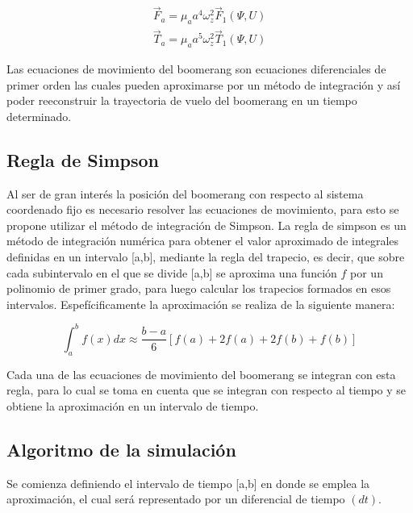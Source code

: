 		\begin{subequations}
    	\begin{align}
		{\vec{F}}_{a}={\mu}_{a}{a}^{4}{\omega}_{z}^{2}{\vec{F}}_{1}(\Psi,U)\\
		{\vec{T}}_{a}={\mu}_{a}{a}^{5}{\omega}_{z}^{2}{\vec{T}}_{1}(\Psi,U)
		\end{align}
		\label{ec64}
		\end{subequations}

	Las ecuaciones de movimiento del boomerang son ecuaciones diferenciales de primer orden las cuales pueden aproximarse por un método de integración y así poder reeconstruir la trayectoria de vuelo del boomerang en un tiempo determinado.

	\subsection{Regla de Simpson}

	Al ser de gran interés la posición del boomerang con respecto al sistema coordenado fijo es necesario resolver las ecuaciones de movimiento, para esto se propone utilizar el método de integración de Simpson.
	La regla de simpson es un método de integración numérica para obtener el valor aproximado de integrales definidas en un intervalo [a,b], mediante la regla del trapecio, es decir, que sobre cada subintervalo en el que se divide [a,b] se aproxima una función $f$ por un polinomio de primer grado, para luego calcular los trapecios formados en esos intervalos. Espefícificamente la aproximación se realiza de la siguiente manera\cite{Granville}:

		\begin{equation}
		\int_{a}^{b} f(x)dx \approx \frac{b-a}{6} \left[ f(a) + 2f(a) + 2f(b) + f(b)\right]
		\label{ec65}
		\end{equation}

	Cada una de las ecuaciones de movimiento del boomerang se integran con esta regla, para lo cual se toma en cuenta que se integran con respecto al tiempo y se obtiene la aproximación en un intervalo de tiempo.

	\subsection{Algoritmo de la simulación}

	Se comienza definiendo el intervalo de tiempo [a,b] en donde se emplea la aproximación, el cual será representado por un diferencial de tiempo $(dt)$.

